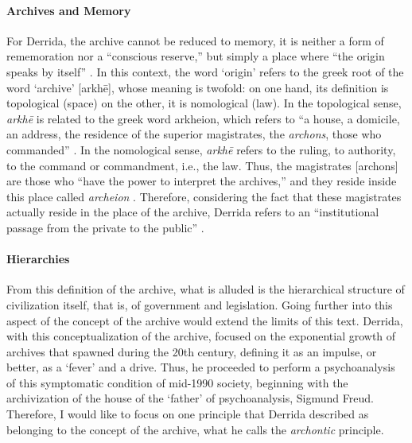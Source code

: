 {
	\paragraph{Archives and Memory}
	For Derrida, the archive cannot be reduced to memory, it is neither a form of rememoration nor a ``conscious reserve,'' but simply a place where ``the origin speaks by itself'' \parencite[60]{Der95:Arc}. In this context, the word `origin' refers to the greek root of the word `archive' [arkhē], whose meaning is twofold: on one hand, its definition is topological (space) on the other, it is nomological (law). In the topological sense, \textit{arkhē} is related to the greek word arkheion, which refers to ``a house, a domicile, an address, the residence of the superior magistrates, the \textit{archons}, those who commanded'' \parencite[9]{Der95:Arc}. In the nomological sense, \textit{arkhē} refers to the ruling, to authority, to the command or commandment, i.e., the law. Thus, the magistrates [archons] are those who ``have the power to interpret the archives,'' and they reside inside this place called \textit{archeion} \parencite[9]{Der95:Arc}. Therefore, considering the fact that these magistrates actually reside in the place of the archive, Derrida refers to an ``institutional passage from the private to the public'' \parencite[9]{Der95:Arc}.

	\paragraph{Hierarchies}


	From this definition of the archive, what is alluded is the hierarchical structure of civilization itself, that is, of government and legislation. Going further into this aspect of the concept of the archive would extend the limits of this text. Derrida, with this conceptualization of the archive, focused on the exponential growth of archives that spawned during the 20th century, defining it as an impulse, or better, as a `fever' and a drive. Thus, he proceeded to perform a psychoanalysis of this symptomatic condition of mid-1990 society, beginning with the archivization of the house of the `father' of psychoanalysis, Sigmund Freud. Therefore, I would like to focus on one principle that Derrida described as belonging to the concept of the archive, what he calls the \textit{archontic} principle. 

}

